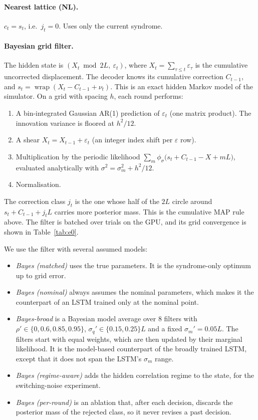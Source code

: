 \paragraph{Nearest lattice (NL).} $c_t=s_t$, i.e.\ $j_t=0$. Uses only the
current syndrome.

\paragraph{Bayesian grid filter.}
The hidden state is $(X_t \bmod 2L,\ \varepsilon_t)$, where
$X_t=\sum_{\tau\le t}\varepsilon_\tau$ is the cumulative uncorrected
displacement. The decoder knows its cumulative correction $C_{t-1}$, and
$s_t=\operatorname{wrap}(X_t-C_{t-1}+\nu_t)$. This is an exact hidden Markov
model of the simulator. On a grid with spacing $h$, each round performs:
\begin{enumerate}
  \item A bin-integrated Gaussian AR(1) prediction of $\varepsilon_t$ (one
    matrix product). The innovation variance is floored at $h^2/12$.
  \item A shear $X_t=X_{t-1}+\varepsilon_t$ (an integer index shift per
    $\varepsilon$ row).
  \item Multiplication by the periodic likelihood
    $\sum_m\phi_{\sigma}\bigl(s_t+C_{t-1}-X+mL\bigr)$, evaluated analytically
    with $\sigma^2=\sigma_m^2+h^2/12$.
  \item Normalisation.
\end{enumerate}
The correction class $j_t$ is the one whose half of the $2L$ circle around
$s_t+C_{t-1}+j_tL$ carries more posterior mass. This is the cumulative MAP
rule above. The filter is batched over trials on the GPU, and its grid
convergence is shown in Table~\ref{tab:e0}.

We use the filter with several assumed models:
\begin{itemize}
  \item \emph{Bayes (matched)} uses the true parameters. It is the
    syndrome-only optimum up to grid error.
  \item \emph{Bayes (nominal)} always assumes the nominal parameters, which
    makes it the counterpart of an LSTM trained only at the nominal point.
  \item \emph{Bayes-broad} is a Bayesian model average over 8 filters with
    $\rho'\in\{0,0.6,0.85,0.95\}$, $\sigma_q'\in\{0.15,0.25\}L$ and a fixed
    $\sigma_m'=0.05L$. The filters start with equal weights, which are then
    updated by their marginal likelihood. It is the model-based counterpart
    of the broadly trained LSTM, except that it does not span the LSTM's
    $\sigma_m$ range.
  \item \emph{Bayes (regime-aware)} adds the hidden correlation regime to the
    state, for the switching-noise experiment.
  \item \emph{Bayes (per-round)} is an ablation that, after each decision,
    discards the posterior mass of the rejected class, so it never revises a
    past decision.
\end{itemize}

